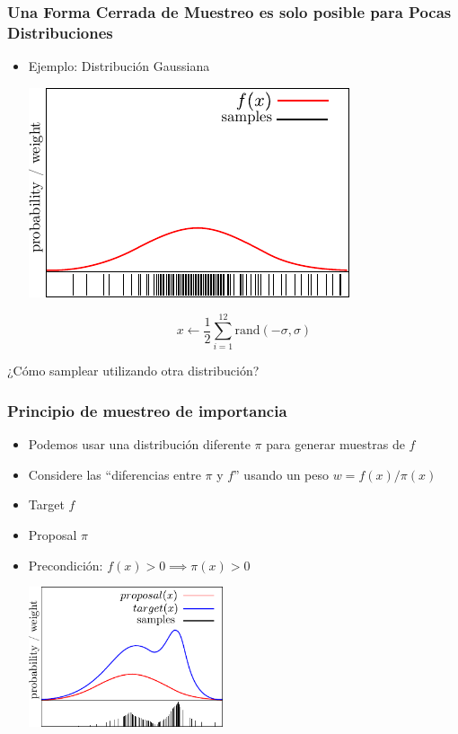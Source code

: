 \begin{frame}
    \frametitle{Una Forma Cerrada de Muestreo es solo posible para Pocas Distribuciones }
    \begin{itemize}
        \item Ejemplo: Distribución Gaussiana
        
        \begin{center}
            \includegraphics[width=0.5\columnwidth]{./images/particle_filter/gaussian_approximation_by_sampling.pdf}
        \end{center}
        
        \begin{equation*}
            x \leftarrow \frac{1}{2} \sum_{i=1}^{12} \text{rand}(-\sigma, \sigma)
        \end{equation*}
    \end{itemize}

    ¿Cómo samplear utilizando otra distribución?



\end{frame}
    


\begin{frame}
    \frametitle{Principio de muestreo de importancia}
    \begin{itemize}
        \item Podemos usar una distribución diferente $\pi$ para generar muestras de $f$
        \item Considere las ``diferencias entre $\pi$ y $f$'' usando un peso $w = f(x) / \pi(x)$
        \item Target $f$
        \item Proposal $\pi$
        \item Precondición:
        $f(x) > 0 \implies \pi(x) > 0$
        \begin{center}
        \includegraphics[width=0.45\textwidth]{./images/particle_filter/importance_sampling_principle.pdf}
        \end{center}
    \end{itemize}
\end{frame}
    
